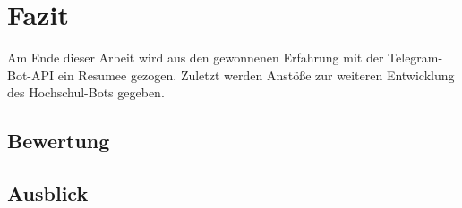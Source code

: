 \chapter{Fazit}
Am Ende dieser Arbeit wird aus den gewonnenen Erfahrung mit der Telegram-Bot-API ein Resumee gezogen. Zuletzt werden Anstöße zur weiteren Entwicklung des Hochschul-Bots gegeben.

\section{Bewertung}
\section{Ausblick}